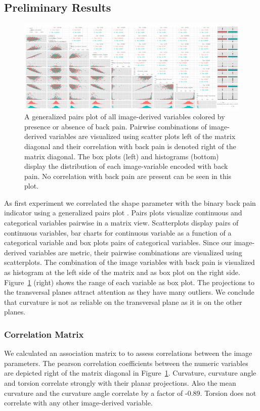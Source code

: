 \documentclass[a4paper,twoside]{style/article}
\begin{document}
\subsection{Preliminary Results}
\begin{figure}[htb]
  \centering
  \includegraphics[width=1.0\textwidth]{figures/image-parameter-range}
  \caption{%
A generalized pairs plot of all image-derived variables \cite{GPLOMS} colored by presence or absence of back pain.
Pairwise combinations of image-derived variables are visualized using scatter plots left of the matrix diagonal and their correlation with back pain is denoted right of the matrix diagonal.
The box plots (left) and histograms (bottom) display the distribution of each image-variable encoded with back pain.
No correlation with back pain are present can be seen in this plot.
}
  \label{fig:image-parameter-range}
\end{figure}
\noindent As first experiment we correlated the shape parameter with the binary back pain indicator using a generalized pairs plot \cite{GPLOMS}.
Pairs plots visualize continuous and categorical variables pairwise in a matrix view.
Scatterplots display pairs of continuous variables, bar charts for continuous variable as a function of a categorical variable and box plots pairs of categorical variables.
Since our image-derived variables are metric, their pairwise combinations are visualized using scatterplots.
The combination of the image variables with back pain is visualized as histogram at the left side of the matrix and as box plot on the right side.
Figure~\ref{fig:image-parameter-range} (right) shows the range of each variable as box plot.
The projections to the transversal planes attract attention as they have many outliers.
We conclude that curvature is not as reliable on the transversal plane as it is on the other planes.
\subsubsection{Correlation Matrix}
We calculated an association matrix to to assess correlations between the image parameters.
The pearson correlation coefficients between the numeric variables are depicted right of the matrix diagonal in Figure~\ref{fig:image-parameter-range}.
Curvature, curvature angle and torsion correlate strongly with their planar projections.
Also the mean curvature and the curvature angle correlate by a factor of -0.89.
Torsion does not correlate with any other image-derived variable.
\end{document}
